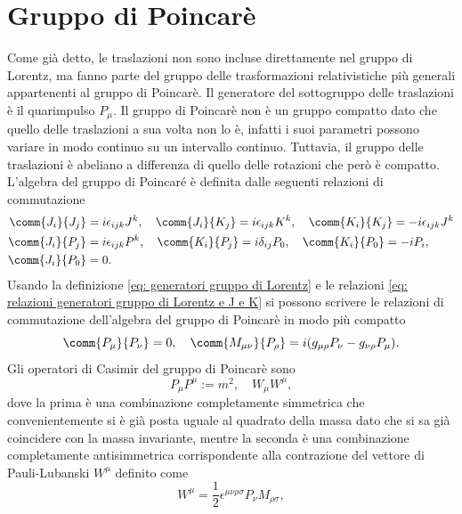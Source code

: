\section{Gruppo di Poincarè}
Come già detto, le traslazioni non sono incluse direttamente nel gruppo di Lorentz, ma fanno parte del gruppo delle trasformazioni relativistiche più generali appartenenti al gruppo di Poincarè. Il generatore del sottogruppo delle traslazioni è il quarimpulso $P_\mu$. Il gruppo di Poincarè non è un gruppo compatto dato che quello delle traslazioni a sua volta non lo è, infatti i suoi parametri possono variare in modo continuo su un intervallo continuo. Tuttavia, il gruppo delle traslazioni è abeliano a differenza di quello delle rotazioni che però è compatto. L'algebra del gruppo di Poincaré è definita dalle seguenti relazioni di commutazione
\begin{equation}
\label{eq: regole di commutazione del GdP}
    \begin{split}
        \comm{J_i}{J_j} &= i\epsilon_{ijk}J^k,\quad\comm{J_i}{K_j} = i\epsilon_{ijk}K^k,\quad\comm{K_i}{K_j}  =-i\epsilon_{ijk}J^k \\ 
        \comm{J_i}{P_j} &= i\epsilon_{ijk}P^k,\quad\comm{K_i}{P_j} = i\delta_{ij}P_0,\quad\comm{K_i}{P_0} = -iP_i, \\
        \comm{J_i}{P_0} &= 0.
    \end{split}
\end{equation}
Usando la definizione \eqref{eq: generatori gruppo di Lorentz} e le relazioni \eqref{eq: relazioni generatori gruppo di Lorentz e J e K} si possono scrivere le relazioni di commutazione dell'algebra del gruppo di Poincarè in modo più compatto
\begin{equation}
    \comm{P_\mu}{P_\nu} = 0,\quad\comm{M_{\mu\nu}}{P_\rho} = i(g_{\mu\rho}P_\nu - g_{\nu\rho}P_\mu).
\end{equation}
Gli operatori di Casimir del gruppo di Poincarè sono
\begin{equation}
    P_\mu P^\mu := m^2,\quad W_\mu W^\mu,
\end{equation}
dove la prima è una combinazione completamente simmetrica che convenientemente si è già posta uguale al quadrato della massa dato che si sa già coincidere con la massa invariante, mentre la seconda è una combinazione completamente antisimmetrica corrispondente alla contrazione del vettore di Pauli-Lubanski $W^\mu$ definito come
\begin{equation}
\label{eq: vettore di Pauli - Lubanski}
    W^\mu = \frac{1}{2}\epsilon^{\mu\nu\rho\sigma}P_\nu M_{\rho\sigma},
\end{equation}
